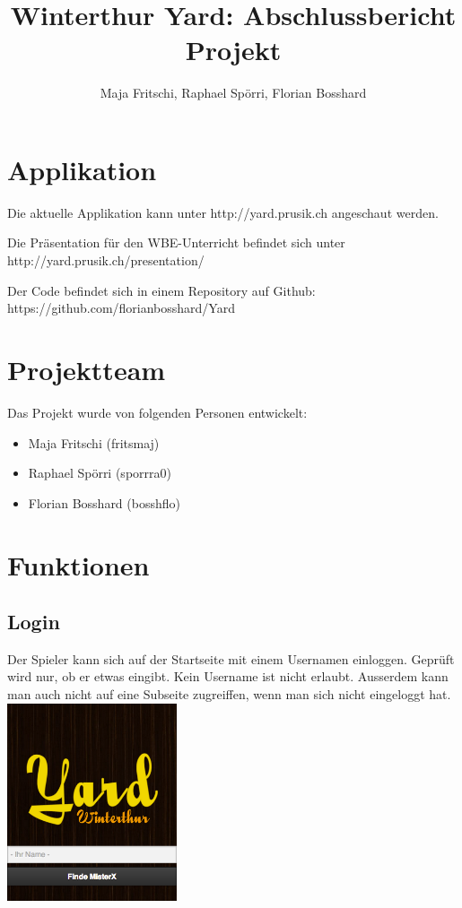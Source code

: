 \documentclass[11pt]{article}
\title{Winterthur Yard: Abschlussbericht Projekt}
\author{Maja Fritschi, Raphael Spörri, Florian Bosshard}
\date{}
\begin{document}
\maketitle

\tableofcontents
\newpage

\section{Applikation}
Die aktuelle Applikation kann unter http://yard.prusik.ch angeschaut werden. 

Die Präsentation für den WBE-Unterricht befindet sich unter http://yard.prusik.ch/presentation/

Der Code befindet sich in einem Repository auf Github: https://github.com/florianbosshard/Yard



\section{Projektteam}
Das Projekt wurde von folgenden Personen entwickelt:
\begin{itemize}
\item Maja Fritschi (fritsmaj)
\item Raphael Spörri (sporrra0)
\item Florian Bosshard (bosshflo)
\end{itemize}



\section{Funktionen}
\subsection{Login}
Der Spieler kann sich auf der Startseite mit einem Usernamen einloggen. Geprüft wird nur, ob er etwas eingibt. Kein Username ist nicht erlaubt. Ausserdem kann man auch nicht auf eine Subseite zugreiffen, wenn man sich nicht eingeloggt hat. \\
\includegraphics[width=5cm]{Bilder/login.png}
\end{document}
